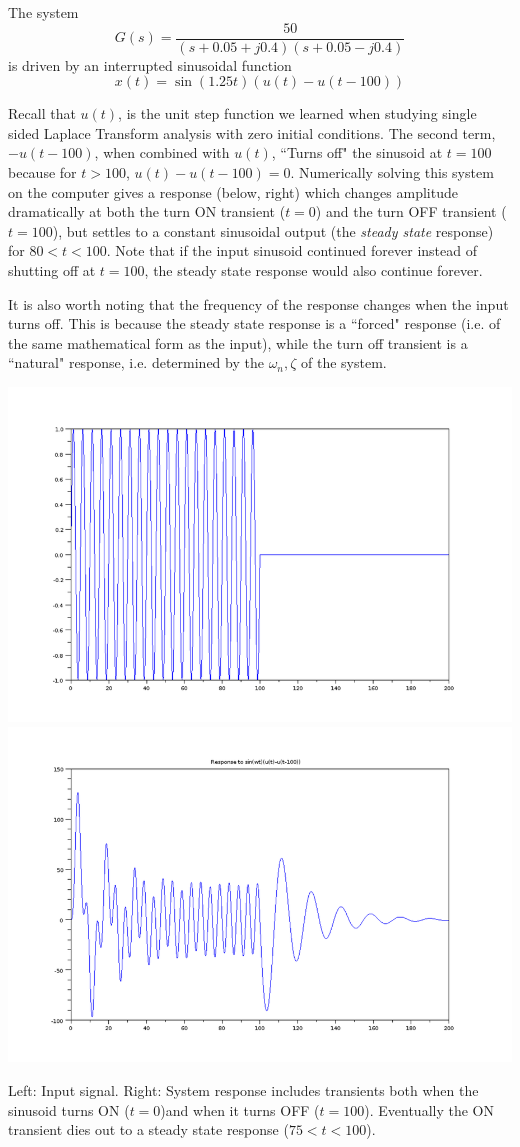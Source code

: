 \begin{Example}
  The system
\[
G(s) = \frac{50}{(s+0.05+j0.4)(s+0.05-j0.4)}
\]
is driven by an interrupted  sinusoidal function
\[
x(t) = \sin(1.25t)(u(t)-u(t-100))
\]

Recall that $u(t)$, is the unit step function we learned when studying single sided Laplace Transform analysis with zero initial conditions.  The second term, $-u(t-100)$, when combined with $u(t)$, ``Turns off" the sinusoid at $t=100$ because for $t>100$, $u(t)-u(t-100) = 0$.
Numerically solving this system on the computer gives a response (below, right) which changes amplitude dramatically at both the turn ON transient ($t=0$) and the turn OFF transient ($t=100$), but settles to a constant sinusoidal output (the {\it steady state} response) for $80< t < 100$.  Note that if the input sinusoid continued forever instead of shutting off at $t=100$, the steady state response would also continue forever.

It is also worth noting that the frequency of the response changes when the input turns off.   This is because the steady state response is a ``forced" response (i.e. of the same mathematical form as the input), while the turn off transient is a ``natural" response, i.e. determined by the $\omega_n, \zeta$ of the system.


\includegraphics[width=3.in]{figs05/sinusoid_input_stepa.png}
\includegraphics[width=3.in]{figs05/sinusoid_transienta.png}

Left:  Input signal. Right: System response includes transients both when the sinusoid turns ON ($t=0$)and when it turns OFF ($t=100$).
Eventually the ON transient dies out to a steady state response ($75<t<100$).

\end{Example}

